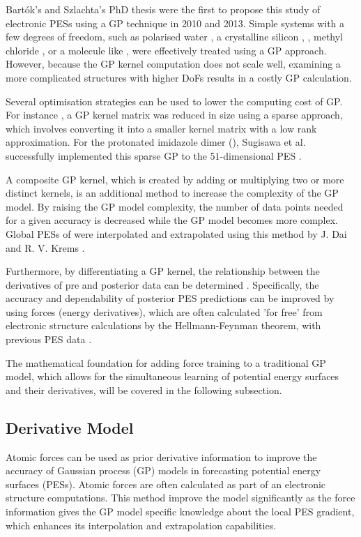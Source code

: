 Bart\'{o}k's and Szlachta's PhD thesis \cite{thesis1, thesis2} were the first to propose this study of electronic PESs using a GP technique in 2010 and 2013. 
Simple systems with a few degrees of freedom, such as polarised water \cite{Handley2009}, a crystalline silicon \cite{Bartk2018, Strickson2019},  \cite{Cui2016}, methyl chloride \cite{Dral2017}, or a molecule like  \cite{Dai2020}, were effectively treated using a GP approach.
However, because the GP kernel computation does not scale well, examining a more complicated structures with higher DoFs results in a costly GP calculation.

Several optimisation strategies can be used to lower the computing cost of GP. 
For instance \cite{RasmussenW06}, a GP kernel matrix was reduced in size using a sparse approach, which involves converting it into a smaller kernel matrix with a low rank approximation.%
For the protonated imidazole dimer (), Sugisawa et al. successfully implemented this sparse GP to the $51$-dimensional PES \cite{Sugisawa2020}.

A composite GP kernel, which is created by adding or multiplying two or more distinct kernels, is an additional method to increase the complexity of the GP model.
By raising the GP model complexity, the number of data points needed for a given accuracy is decreased while the GP model becomes more complex.
Global PESs of  were interpolated and extrapolated using this method by J. Dai and R. V. Krems \cite{Dai2020}.

Furthermore, by differentiating a GP kernel, the relationship between the derivatives of pre and posterior data can be determined \cite{Solak2002, mchutchon_dierentiating_2013, https://doi.org/10.48550/arxiv.1704.00060}. Specifically, the accuracy and dependability of posterior PES predictions can be improved by using forces (energy derivatives), which are often calculated 'for free' from electronic structure calculations by the Hellmann-Feynman theorem, with previous PES data \cite{Deringer2021}. 

The mathematical foundation for adding force training to a traditional GP model, which allows for the simultaneous learning of potential energy surfaces and their derivatives, will be covered in the following subsection.

\subsection{Derivative Model} \label{subsec:2.3.2}
Atomic forces can be used as prior derivative information to improve the accuracy of Gaussian process (GP) models in forecasting potential energy surfaces (PESs).
Atomic forces are often calculated as part of an electronic structure computations.
This method improve the model significantly as the force information gives the GP model specific knowledge about the local PES gradient, which enhances its interpolation and extrapolation capabilities.

